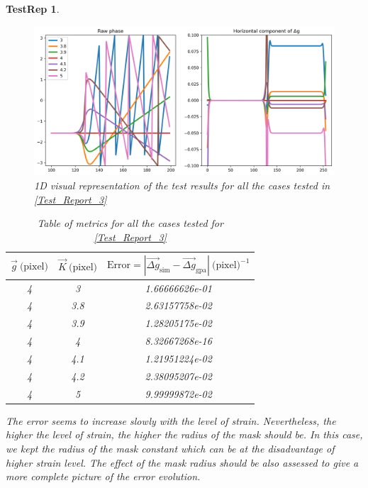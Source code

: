 \documentclass[12pt, titlepage]{article}
\newtheorem{TestRep}{TestRep}
\begin{document}
\begin{TestRep}
\begin{figure}[H]
\begin{center}
\includegraphics[scale=0.5]{Figures/Test_3_test_results.png}
\caption{1D visual representation of the test results for all the cases tested in \cref{Test_Report_3}}
\label{fig:Test_3_test_results}
\end{center}
\end{figure}

\begin{table}[H]
\centering
\begin{tabular}{|c|c|c|}
\hline
$\overrightarrow{g} \ \text{(pixel)}$ & $\overrightarrow{K} \ \text{(pixel)}$ & $\text{Error}=|\overrightarrow{\Delta g}_{\text{sim}}-\overrightarrow{\Delta g}_{\text{gpa}}| \ \text{(pixel)}^{-1}$ \\
\hline
4 & 3 & 1.66666626e-01 \\ \hline
4 & 3.8 & 2.63157758e-02 \\ \hline
4 & 3.9 & 1.28205175e-02 \\ \hline
4 & 4 & 8.32667268e-16 \\ \hline
4 & 4.1 & 1.21951224e-02 \\ \hline
4 & 4.2 & 2.38095207e-02 \\ \hline
4 & 5 & 9.99999872e-02 \\ \hline
\end{tabular}
\caption{Table of metrics for all the cases tested for \cref{Test_Report_3}}\label{tb:Metric_test_3_multi_case}
\end{table}

The error seems to increase slowly with the level of strain. Nevertheless, the higher the level of strain, the higher the radius of the mask should be. In this case, we kept the radius of the mask constant which can be at the disadvantage of higher strain level. The effect of the mask radius should be also assessed to give a more complete picture of the error evolution.
\end{TestRep}
\end{document}
